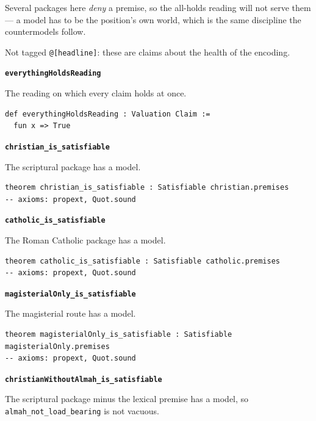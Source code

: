 \documentclass[11pt]{article}
\begin{document}
Several packages here \emph{deny} a premise, so the all-holds reading will not serve them — a model has to be the position's own world, which is the same discipline the countermodels follow.

Not tagged \texttt{@[headline]}: these are claims about the health of the encoding.

\par\medskip\noindent\textbf{\texttt{everything\allowbreak{}Holds\allowbreak{}Reading}}\par\nobreak\noindent
The reading on which every claim holds at once.

{\small\begin{verbatim}
def everythingHoldsReading : Valuation Claim :=
  fun x => True
\end{verbatim}}
\par\medskip\noindent\textbf{\texttt{christian\_\allowbreak{}is\_\allowbreak{}satisfiable}}\par\nobreak\noindent
The scriptural package has a model.

{\small\begin{verbatim}
theorem christian_is_satisfiable : Satisfiable christian.premises
-- axioms: propext, Quot.sound
\end{verbatim}}
\par\medskip\noindent\textbf{\texttt{catholic\_\allowbreak{}is\_\allowbreak{}satisfiable}}\par\nobreak\noindent
The Roman Catholic package has a model.

{\small\begin{verbatim}
theorem catholic_is_satisfiable : Satisfiable catholic.premises
-- axioms: propext, Quot.sound
\end{verbatim}}
\par\medskip\noindent\textbf{\texttt{magisterial\allowbreak{}Only\_\allowbreak{}is\_\allowbreak{}satisfiable}}\par\nobreak\noindent
The magisterial route has a model.

{\small\begin{verbatim}
theorem magisterialOnly_is_satisfiable : Satisfiable magisterialOnly.premises
-- axioms: propext, Quot.sound
\end{verbatim}}
\par\medskip\noindent\textbf{\texttt{christian\allowbreak{}Without\allowbreak{}Almah\_\allowbreak{}is\_\allowbreak{}satisfiable}}\par\nobreak\noindent
The scriptural package minus the lexical premise has a model, so \texttt{almah\_\allowbreak{}not\_\allowbreak{}load\_\allowbreak{}bearing} is not vacuous.
\end{document}
